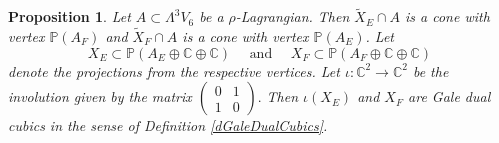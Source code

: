 \documentclass[11pt]{amsart}
\theoremstyle{plain}
\newtheorem{proposition}[theorem]{Proposition}
\numberwithin{equation}{section}
\theoremstyle{definition}
\theoremstyle{remark}
\newcommand{\C}{\mathbb C}
\renewcommand{\P}{\mathbb P}
\newcommand{\quadand}{\quad \text{ and } \quad}
\begin{document}
\begin{proposition}\label{pProjectionLagrangian}
    Let $A \subset \Lambda^3 V_6$ be a $\rho$-Lagrangian. Then $\widetilde{X}_E \cap A$ is a cone with vertex $\P(A_F)$ and $\widetilde{X}_F\cap A$ is a cone with vertex $\P(A_E)$. Let 
    \[
        X_E \subset \P(A_E\oplus \C \oplus \C) 
        \quadand
    X_F \subset \P(A_F\oplus \C \oplus \C)
    \]
    denote the projections from the respective vertices. Let $\iota \colon \C^2 \to \C^2$
    be the involution given by the matrix 
    $\left(\begin{smallmatrix} 0 & 1 \\ 1 & 0 \end{smallmatrix}\right).$
    Then $\iota(X_E)$ and $X_F$ are Gale dual cubics in the sense of Definition \ref{dGaleDualCubics}. 
\end{proposition}    

\newcommand{\toAdual}{\pi}
    
\end{document}
